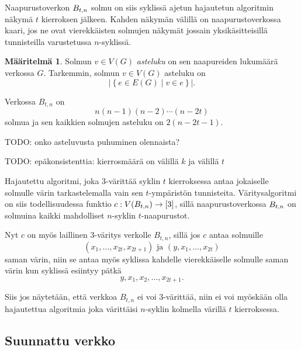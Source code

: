 \documentclass[finnish]{tktltiki2}
\theoremstyle{definition}
\newtheorem{maar}[lau]{Määritelmä}
\theoremstyle{remark}
\newcommand{\set}[1]{\left\{ #1 \right\}}
\begin{document}
Naapurustoverkon $B_{t,n}$ solmu on siis syklissä ajetun hajautetun algoritmin
näkymä $t$ kierroksen jälkeen. Kahden näkymän välillä on naapurustoverkossa
kaari, jos ne ovat vierekkäisten solmujen näkymät jossain yksikäsitteisillä
tunnisteilla varustetussa $n$-syklissä.

\begin{maar}
    Solmun $v \in V(G)$ \emph{asteluku} on sen naapureiden lukumäärä verkossa
    $G$. Tarkemmin, solmun $v \in V(G)$ asteluku on
    \begin{equation*}
            |\set{e \in E(G) \mid v \in e}|.
    \end{equation*}
\end{maar}

Verkossa $B_{t,n}$ on
%
\begin{equation*}
    n(n-1)(n-2) \cdots (n-2t)
\end{equation*}
%
solmua ja sen kaikkien solmujen asteluku on $2(n-2t-1)$.


TODO: onko asteluvusta puhuminen olennaista?

TODO: epäkonsistenttia: kierrosmäärä on välillä $k$ ja välillä $t$

Hajautettu algoritmi, joka 3-värittää syklin $t$ kierroksessa antaa jokaiselle
solmulle värin tarkastelemalla vain sen $t$-ympäristön tunnisteita.
Väritysalgoritmi on siis todellisuudessa funktio $c : V(B_{t,n}) \to [3]$, sillä
naapurustoverkossa $B_{t,n}$ on solmuina kaikki mahdolliset $n$-syklin
$t$-naapurustot.

Nyt $c$ on myös laillinen 3-väritys verkolle $B_{t,n}$, sillä jos $c$ antaa
solmuille
%
\begin{equation*}
    (x_1, \dots, x_{2t}, x_{2t+1}) \text{ ja } (y,x_1,\dots,x_{2t})
\end{equation*}
%
saman värin, niin se antaa myös syklissa kahdelle vierekkäiselle solmulle saman
värin kun syklissä esiintyy pätkä
%
\begin{equation*}
    y, x_1, x_2, \dots, x_{2t+1}.
\end{equation*}

Siis jos näytetään, että verkkoa $B_{t,n}$ ei voi 3-värittää, niin ei voi
myöskään olla hajautettua algoritmia joka värittäisi $n$-syklin kolmella
värillä $t$ kierroksessa.

\subsection{Suunnattu verkko}
\end{document}
